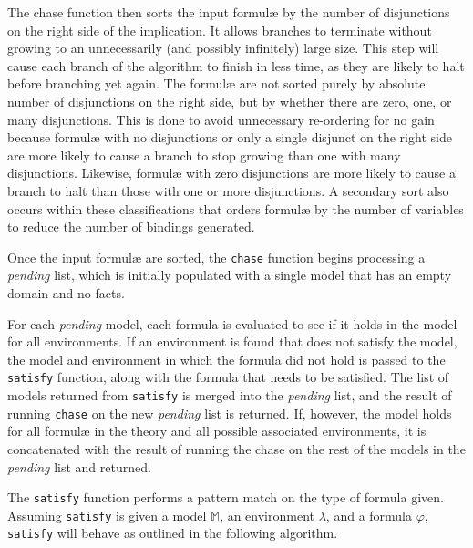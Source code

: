 		The chase function then sorts the input formul{\ae} by the number of
		disjunctions on the right side of the implication. It allows branches to
		terminate without growing to an unnecessarily (and possibly infinitely)
		large size. This step will cause each branch of the algorithm to finish in
		less time, as they are likely to halt before branching yet again. The
		formul{\ae} are not sorted purely by absolute number of disjunctions on the
		right side, but by whether there are zero, one, or many disjunctions. This
		is done to avoid unnecessary re-ordering for no gain because formul{\ae}
		with no disjunctions or only a single disjunct on the right side are more
		likely to cause a branch to stop growing than one with many disjunctions.
		Likewise, formul{\ae} with zero disjunctions are more likely to cause a
		branch to halt than those with one or more disjunctions. A secondary sort
		also occurs within these classifications that orders formul{\ae} by the
		number of variables to reduce the number of bindings generated.

		Once the input formul{\ae} are sorted, the {\tt chase} function begins
		processing a \emph{pending} list, which is initially populated with a
		single model that has an empty domain and no facts.

		For each \emph{pending} model, each formula is evaluated to see if it holds
		in the model for all environments. If an environment is found that does not
		satisfy the model, the model and environment in which the formula did not
		hold is passed to the {\tt satisfy} function, along with the formula that needs
		to be satisfied. The list of models returned from {\tt satisfy} is merged into
		the \emph{pending} list, and the result of running {\tt chase} on the new
		\emph{pending} list is returned. If, however, the model holds for all
		formul{\ae} in the theory and all possible associated environments, it is
		concatenated with the result of running the chase on the rest of the models
		in the \emph{pending} list and returned.

		The {\tt satisfy} function performs a pattern match on the type of formula
		given. Assuming {\tt satisfy} is given a model $\mathbb{M}$, an environment
		$\lambda$, and a formula $\varphi$, {\tt satisfy} will behave as outlined
		in the following algorithm.

		~\\

